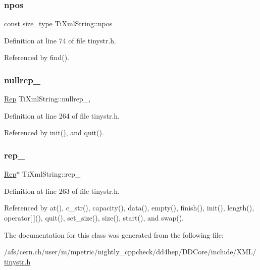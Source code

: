 \subsubsection{\texorpdfstring{npos}{npos}}
{\footnotesize\ttfamily const \hyperlink{class_ti_xml_string_abeb2c1893a04c17904f7c06546d0b971}{size\+\_\+type} Ti\+Xml\+String\+::npos\hspace{0.3cm}{\ttfamily [static]}}



Definition at line 74 of file tinystr.\+h.



Referenced by find().

\hypertarget{class_ti_xml_string_a345791f81a4b1da64404886f3b2c244d}{}\label{class_ti_xml_string_a345791f81a4b1da64404886f3b2c244d} 
\subsubsection{\texorpdfstring{nullrep\+\_\+}{nullrep\_}}
{\footnotesize\ttfamily \hyperlink{struct_ti_xml_string_1_1_rep}{Rep} Ti\+Xml\+String\+::nullrep\+\_\+\hspace{0.3cm}{\ttfamily [static]}, {\ttfamily [private]}}



Definition at line 264 of file tinystr.\+h.



Referenced by init(), and quit().

\hypertarget{class_ti_xml_string_ac7be48f31ca451bcb16de428b5c40e0c}{}\label{class_ti_xml_string_ac7be48f31ca451bcb16de428b5c40e0c} 
\subsubsection{\texorpdfstring{rep\+\_\+}{rep\_}}
{\footnotesize\ttfamily \hyperlink{struct_ti_xml_string_1_1_rep}{Rep}$\ast$ Ti\+Xml\+String\+::rep\+\_\+\hspace{0.3cm}{\ttfamily [private]}}



Definition at line 263 of file tinystr.\+h.



Referenced by at(), c\+\_\+str(), capacity(), data(), empty(), finish(), init(), length(), operator\mbox{[}$\,$\mbox{]}(), quit(), set\+\_\+size(), size(), start(), and swap().



The documentation for this class was generated from the following file\+:\begin{DoxyCompactItemize}
\item 
/afs/cern.\+ch/user/m/mpetric/nightly\+\_\+cppcheck/dd4hep/\+D\+D\+Core/include/\+X\+M\+L/\hyperlink{tinystr_8h}{tinystr.\+h}\end{DoxyCompactItemize}
